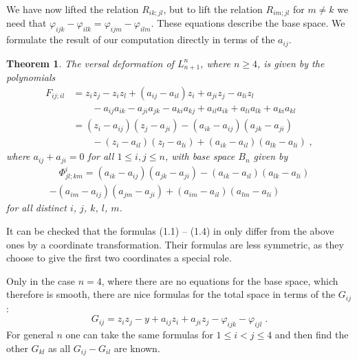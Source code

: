 \documentclass[12pt,a4paper]{amsart}  %
\newcommand{\vp}{\varphi}
\newtheorem{thm}{Theorem}[section]
\theoremstyle{definition}
\theoremstyle{remark}
\begin{document}
We have now lifted the relation $R_{ik;jl}$, but to lift the relation $R_{im;jl}$ for $m\neq k$
we need that   $\vp_{ijk}-\vp_{ilk}=\vp_{ijm}-\vp_{ilm}$. These equations describe
the base space. We formulate  the result of our computation directly
in terms of the $a_{ij}$.


\begin{thm}\label{versal-def-thm}
The versal deformation of $L_{n+1}^n$, where $n\geq 4$, is given by the polynomials
\begin{align*}
F_{ij;il}&= z_iz_j-z_iz_l+(a_{ij}-a_{il})z_i+a_{ji}z_j-a_{li}z_l \\
&\qquad - a_{ij}a_{ik}-a_{ji}a_{jk}-a_{ki}a_{kj}+ a_{il}a_{ik}+a_{li}a_{lk}+a_{ki}a_{kl}\\
&=(z_i-a_{ij})(z_j-a_{ji})-(a_{ik}-a_{ij})(a_{jk}-a_{ji})\\
&\qquad -(z_i-a_{il})(z_l-a_{li})+(a_{ik}-a_{il})(a_{lk}-a_{li})\;,
\end{align*}
where $a_{ij}+a_{ji}=0$ for all $1\leq i,j\leq n$,
with base space $B_n$ given by 
\begin{multline*}
\quad \Phi^i_{jl;km}=(a_{ik}-a_{ij})(a_{jk}-a_{ji})-(a_{ik}-a_{il})(a_{lk}-a_{li})\\
- (a_{im}-a_{ij})(a_{jm}-a_{ji})+(a_{im}-a_{il})(a_{lm}-a_{li})\quad
\end{multline*}
for all distinct $i$, $j$, $k$, $l$, $m$.
\end{thm}  

It can be checked that the formulas (1.1) -- (1.4) in \cite{LP} only differ from the above ones
by a coordinate transformation. Their formulas are less symmetric, as they choose to give the
first two coordinates a special role.

Only in the case $n=4$, where there are no equations for the base space, which 
therefore is smooth, there are nice formulas for the total
space in terms of the $G_{ij}$:
\[
G_{ij}=z_iz_j-y+ a_{ij}z_i+a_{ji}z_j-\vp_{ijk}-\vp_{ijl}\;.
\]
For general $n$  one can take the same formulas for $1\leq i < j \leq 4$ and then 
find the other $G_{kl}$ as all $G_{ij}-G_{il}$ are known.

\end{document}

